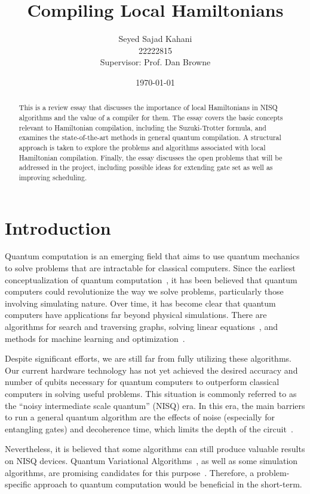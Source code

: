 \documentclass{report}
\title{Compiling Local Hamiltonians}
\author{Seyed Sajad Kahani \\ 22222815 \\Supervisor: Prof. Dan Browne}
\date{\today}
\begin{document}
\maketitle

\tableofcontents

\begin{abstract}
  This is a review essay that discusses the importance of local Hamiltonians in NISQ algorithms and the value of a compiler for them. The essay covers the basic concepts relevant to Hamiltonian compilation, including the Suzuki-Trotter formula, and examines the state-of-the-art methods in general quantum compilation. A structural approach is taken to explore the problems and algorithms associated with local Hamiltonian compilation. Finally, the essay discusses the open problems that will be addressed in the project, including possible ideas for extending gate set as well as improving scheduling.
\end{abstract}

\chapter{Introduction}

Quantum computation is an emerging field that aims to use quantum mechanics to solve problems that are intractable for classical computers. Since the earliest conceptualization of quantum computation~\cite{feynman1986}, it has been believed that quantum computers could revolutionize the way we solve problems, particularly those involving simulating nature. Over time, it has become clear that quantum computers have applications far beyond physical simulations. There are algorithms for search and traversing graphs, solving linear equations~\cite{montanaro2016}, and methods for machine learning and optimization~\cite{jordan2023}.

Despite significant efforts, we are still far from fully utilizing these algorithms. Our current hardware technology has not yet achieved the desired accuracy and number of qubits necessary for quantum computers to outperform classical computers in solving useful problems. This situation is commonly referred to as the ``noisy intermediate scale quantum'' (NISQ) era. In this era, the main barriers to run a general quantum algorithm are the effects of noise (especially for entangling gates) and decoherence time, which limits the depth of the circuit~\cite{preskill2018}.

Nevertheless, it is believed that some algorithms can still produce valuable results on NISQ devices. Quantum Variational Algorithms~\cite{cerezo2021}, as well as some simulation algorithms, are promising candidates for this purpose~\cite{preskill2018, langione2019}. Therefore, a problem-specific approach to quantum computation would be beneficial in the short-term.
\end{document}
